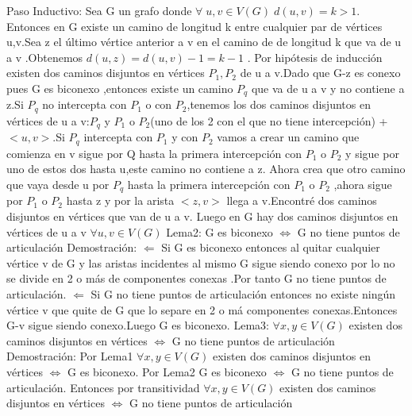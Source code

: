 \documentclass{article}
\begin{document}
    Paso Inductivo:\newline
    Sea G un grafo donde $\forall\; u,v\in V(G)\; d(u,v)=k>1$. Entonces en G existe un camino de longitud k entre 
    cualquier par de v\'ertices u,v.Sea z el \'ultimo v\'ertice anterior a v en el camino de de longitud k que va de
    u a v .Obtenemos $d(u,z)=d(u,v)-1=k-1$ . Por hip\'otesis de inducci\'on existen dos caminos disjuntos en v\'ertices 
    $P_{1},P_{2}$ de u a v.Dado que G-z es conexo pues G es biconexo ,entonces existe un camino $P_{q}$ que va de u a v
    y no contiene a z.Si $P_{q}$ no intercepta con $P_{1}$ o con $P_{2}$,tenemos los dos caminos disjuntos en v\'ertices
    de u a v:$P_{q}$ y $P_{1}$ o $P_{2}$(uno de los 2 con el que no tiene intercepci\'on) + $<u,v>$.Si $P_{q}$ intercepta 
    con $P_{1}$ y con $P_{2}$ vamos a crear un camino que comienza en v sigue por Q hasta la primera intercepci\'on con
    $P_{1}$ o $P_{2}$ y sigue por uno de estos dos hasta u,este camino no contiene a z. Ahora crea que otro camino que vaya 
    desde u por $P_{q}$ hasta la primera intercepci\'on con $P_{1}$ o $P_{2}$ ,ahora sigue por $P_{1}$ o $P_{2}$ hasta z 
    y por la arista $<z,v>$ llega a v.Encontr\'e dos caminos disjuntos en v\'ertices que van de u a v.\newline
    Luego en G hay dos caminos disjuntos en v\'ertices de u a v $\forall u,v \in V(G)$
    \newline
    \newline
    Lema2:\newline
    G es biconexo $\Longleftrightarrow$ G no tiene puntos de articulaci\'on \newline
    Demostraci\'on:\newline
    $\Longleftarrow$\newline
    Si G es biconexo entonces al quitar cualquier v\'ertice v de G y las aristas incidentes al mismo 
    G sigue siendo conexo por lo no se divide en 2 o m\'as de componentes conexas .Por tanto G no
    tiene puntos de articulaci\'on.\newline
    $\Longleftarrow$\newline
    Si G no tiene puntos de articulaci\'on entonces no existe ning\'un  v\'ertice v que quite de G que lo separe en
    2 o m\'a  componentes conexas.Entonces G-v sigue siendo conexo.Luego G es biconexo.
    \newline
    \newline
    Lema3:\newline
    $\forall x,y\in V(G)$ existen dos caminos disjuntos en v\'ertices $\Longleftrightarrow$ G no tiene puntos de articulaci\'on\newline
    Demostraci\'on:\newline
    Por Lema1  $\forall x,y\in V(G)$ existen dos caminos disjuntos en v\'ertices $\Longleftrightarrow$ G es biconexo. 
    Por Lema2 G es biconexo $\Longleftrightarrow$ G no tiene puntos de articulaci\'on.
    Entonces por transitividad $\forall x,y\in V(G)$ existen dos caminos disjuntos en v\'ertices 
    $\Longleftrightarrow$ G no tiene puntos de articulaci\'on
    \newline
    
\end{document}
